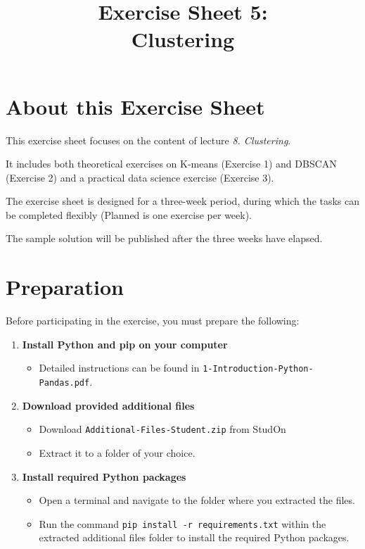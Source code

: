 \documentclass[
english,
smallborders
]{i6prcsht}
\begin{document}
\title{Exercise Sheet 5: \\ Clustering}
\maketitle
\vspace*{-2cm}

\section*{About this Exercise Sheet}

This exercise sheet focuses on the content of lecture \textit{8. Clustering}.

It includes both theoretical exercises on K-means (Exercise 1) and DBSCAN (Exercise 2) and a practical data science exercise (Exercise 3).

The exercise sheet is designed for a three-week period, during which the tasks can be completed flexibly (Planned is one exercise per week).

The sample solution will be published after the three weeks have elapsed.

\section*{Preparation}

Before participating in the exercise, you must prepare the following:

\begin{enumerate}
	\item \textbf{Install Python and pip on your computer}

	      \begin{itemize}
		      \item Detailed instructions can be found in \texttt{1-Introduction-Python-Pandas.pdf}.
	      \end{itemize}

	\item \textbf{Download provided additional files}

	      \begin{itemize}
		      \item Download \texttt{Additional-Files-Student.zip} from StudOn
		      \item Extract it to a folder of your choice.
	      \end{itemize}

	\item \textbf{Install required Python packages}

	      \begin{itemize}
		      \item Open a terminal and navigate to the folder where you extracted the files.
		      \item Run the command \texttt{pip install -r requirements.txt} within the extracted additional files folder to install the required Python packages.
	      \end{itemize}


\end{enumerate}
\end{document}
